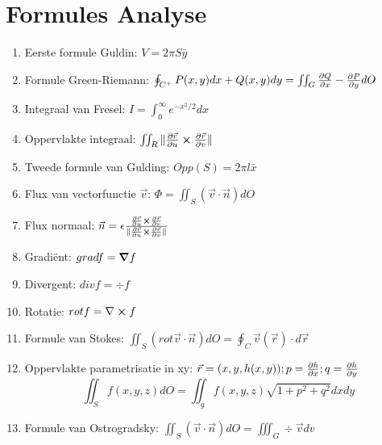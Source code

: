\documentclass[12pt]{article}
\begin{document}
    \maketitle

    \section{Formules Analyse}
    \label{sec:formules_analyse}
   
    \begin{enumerate}
	    \item Eerste formule Guldin: $ V = 2\pi S \bar{y}$
	    \item Formule Green-Riemann: $ \oint_{C^+} P(x, y)dx + Q(x, y)dy = \iint_G \pdv{Q}{x} - \pdv{P}{y} dO $
	    \item Integraal van Fresel: $ I = \int_0^{\infty} e^{-x^2/2} dx$
    	    \item Oppervlakte integraal:  $ \iint_R \| \pdv{\vec{r}}{u} \cross \pdv{\vec{r}}{v} \| $
            \item Tweede formule van Gulding: $ Opp(S) = 2\pi l \bar{x}$
	    \item Flux van vectorfunctie $ \vec{v}$: $ \Phi = \iint_S (\vec{v} \cdot \vec{n}) dO$
	    \item Flux normaal: $\vec{n} = \epsilon \frac{\pdv{\vec{r}}{u} \cross \pdv{\vec{r}}{v}}{\| \pdv{\vec{r}}{u} \cross \pdv{\vec{r}}{v} \| }$
	    \item Gradi\"ent: $ grad f = \grad f$
	    \item Divergent: $ div f = \div f $
	    \item Rotatie: $ rot f = \nabla \cross f $
	    \item Formule van Stokes:  $ \iint_S (rot \vec{ v}\cdot \vec{n}) dO = \oint_C \vec{v}(\vec{r}) \cdot d \vec{r} $
	    \item Oppervlakte parametrisatie in xy: $ \vec{r} = (x, y, h(x,y)); p = \pdv{h}{x}; q = \pdv{h}{y} $ $$ \iint_S f(x,y,z) dO = \iint_g f(x,y,z) \sqrt{1+p^2+q^2} dxdy  $$
	    \item Formule van Ostrogradsky: $ \iint_S (\vec{v} \cdot \vec{n})dO = \iiint_G \div \vec{v} dv$
    \end{enumerate}
    
\end{document}
